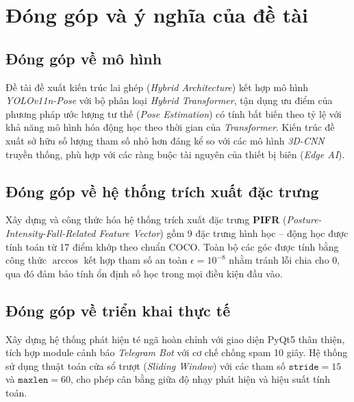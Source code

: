 
\section{Đóng góp và ý nghĩa của đề tài}
\label{sec:dong_gop_va_y_nghia}

\subsection{Đóng góp về mô hình}
\label{sec:dong_gop_model}

\noindent\hspace{1.2em}Đề tài đề xuất kiến trúc lai ghép (\textit{Hybrid Architecture}) kết hợp mô hình \textit{YOLOv11n-Pose} với bộ phân loại \textit{Hybrid Transformer}, tận dụng ưu điểm của phương pháp ước lượng tư thế (\textit{Pose Estimation}) có tính bất biến theo tỷ lệ với khả năng mô hình hóa động học theo thời gian của \textit{Transformer}. Kiến trúc đề xuất sở hữu số lượng tham số nhỏ hơn đáng kể so với các mô hình \textit{3D-CNN} truyền thống, phù hợp với các ràng buộc tài nguyên của thiết bị biên (\textit{Edge AI}).

\subsection{Đóng góp về hệ thống trích xuất đặc trưng}
\label{sec:dong_gop_features}

\noindenthspace{1.2em}Xây dựng và công thức hóa hệ thống trích xuất đặc trưng \textbf{PIFR} (\textit{Posture-Intensity-Fall-Related Feature Vector}) gồm 9 đặc trưng hình học -- động học được tính toán từ 17 điểm khớp theo chuẩn COCO. Toàn bộ các góc được tính bằng công thức $\arccos$ kết hợp tham số an toàn $\epsilon = 10^{-8}$ nhằm tránh lỗi chia cho $0$, qua đó đảm bảo tính ổn định số học trong mọi điều kiện đầu vào.

\subsection{Đóng góp về triển khai thực tế}
\label{sec:dong_gop_deployment}

\noindenthspace{1.2em}Xây dựng hệ thống phát hiện té ngã hoàn chỉnh với giao diện PyQt5 thân thiện, tích hợp module cảnh báo \textit{Telegram Bot} với cơ chế chống spam 10 giây. Hệ thống sử dụng thuật toán cửa sổ trượt (\textit{Sliding Window}) với các tham số $\texttt{stride} = 15$ và $\texttt{maxlen} = 60$, cho phép cân bằng giữa độ nhạy phát hiện và hiệu suất tính toán.

